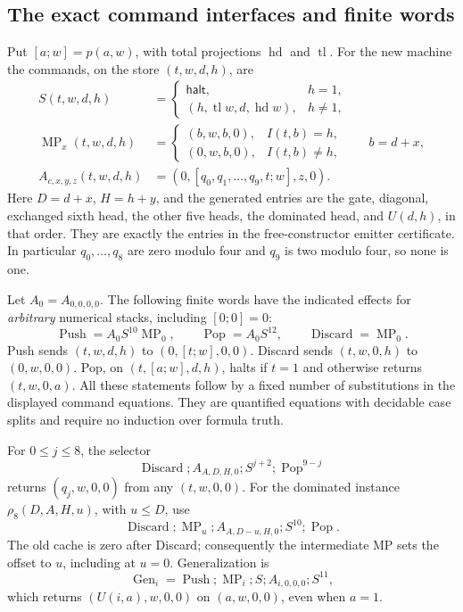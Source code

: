 \subsection{The exact command interfaces and finite words}

Put $[a;w]=p(a,w)$, with total projections $\operatorname{hd}$ and
$\operatorname{tl}$.  For the new machine the commands, on the store
$(t,w,d,h)$, are
\begin{align*}
 S(t,w,d,h)&=
 \begin{cases}\mathsf{halt},&h=1,\\
 (h,\operatorname{tl}w,d,\operatorname{hd}w),&h\ne1,
 \end{cases}\\
 \operatorname{MP}_x(t,w,d,h)&=
 \begin{cases}(b,w,b,0),&I(t,b)=h,\\(0,w,b,0),&I(t,b)\ne h,
 \end{cases}\qquad b=d+x,\\
 A_{c,x,y,z}(t,w,d,h)&=
       (0,[q_0,q_1,\ldots,q_9,t;w],z,0).
\end{align*}
Here $D=d+x$, $H=h+y$, and the generated entries are the gate,
diagonal, exchanged sixth head, the other five heads, the dominated
head, and $U(d,h)$, in that order.  They are exactly the entries in
the free-constructor emitter certificate.  In particular $q_0,\ldots,q_8$
are zero modulo four and $q_9$ is two modulo four, so none is one.

Let $A_0=A_{0,0,0,0}$.  The following finite words have the indicated
effects for \emph{arbitrary} numerical stacks, including $[0;0]=0$:
\[
 \operatorname{Push}=A_0S^{10}\operatorname{MP}_0,
 \qquad\operatorname{Pop}=A_0S^{12},
 \qquad\operatorname{Discard}=\operatorname{MP}_0.
\]
Push sends $(t,w,d,h)$ to $(0,[t;w],0,0)$.  Discard sends
$(t,w,0,h)$ to $(0,w,0,0)$.  Pop, on $(t,[a;w],d,h)$, halts if
$t=1$ and otherwise returns $(t,w,0,a)$.  All these statements follow
by a fixed number of substitutions in the displayed command equations.
They are quantified equations with decidable case splits and require
no induction over formula truth.

For $0\leq j\leq8$, the selector
\[
 \operatorname{Discard};A_{A,D,H,0};S^{j+2};
                  \operatorname{Pop}^{9-j}                 \tag{2}
\]
returns $(q_j,w,0,0)$ from any $(t,w,0,0)$.  For the dominated
instance $\rho_8(D,A,H,u)$, with $u\leq D$, use
\[
 \operatorname{Discard};\operatorname{MP}_u;
       A_{A,D-u,H,0};S^{10};\operatorname{Pop}.             \tag{3}
\]
The old cache is zero after Discard; consequently the intermediate
MP sets the offset to $u$, including at $u=0$.  Generalization is
\[
 \operatorname{Gen}_i=\operatorname{Push};\operatorname{MP}_i;S;
                A_{i,0,0,0};S^{11},                       \tag{4}
\]
which returns $(U(i,a),w,0,0)$ on $(a,w,0,0)$, even when $a=1$.

